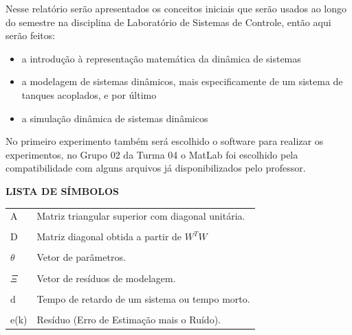 \documentclass[a4paper,12pt]{article}
\begin{document}
\vspace{3cm}

\begin{flushleft}

\hspace{4ex} Nesse relatório serão apresentados os conceitos iniciais que serão usados ao longo do semestre na disciplina de Laboratório de Sistemas de Controle, então aqui serão feitos:
\begin{itemize}
	\item a introdução à representação matemática da dinâmica de sistemas
	\item a modelagem de sistemas dinâmicos, mais especificamente de um sistema de tanques acoplados, e por último
	\item a simulação dinâmica de sistemas dinâmicos
\end{itemize}

No primeiro experimento também será escolhido o software para realizar os experimentos, no Grupo 02 da Turma 04 o MatLab foi escolhido pela compatibilidade com alguns arquivos já disponibilizados pelo professor.\\

\end{flushleft}

\vspace{1.5cm}


\newpage


\thispagestyle{empty}

\begin{center}
{\large \textbf{LISTA DE SÍMBOLOS}}
\end{center}

\vspace{3cm}

\begin{tabular}{ l l }
A\hspace{1.5cm} & Matriz triangular superior com diagonal unitária.\\
\phantom{a} & \phantom{a}\\
D\hspace{1.5cm} & Matriz diagonal obtida a partir de $W^{T}W$\\
\phantom{a} & \phantom{a}\\
$\theta$\hspace{1.5cm} & Vetor de parâmetros.\\
\phantom{a} & \phantom{a}\\
$\Xi$\hspace{1.5cm} & Vetor de resíduos de modelagem.\\
\phantom{a} & \phantom{a}\\
d\hspace{1.5cm} & Tempo de retardo de um sistema ou tempo morto.\\
\phantom{a} & \phantom{a}\\
e(k)\hspace{1.5cm} & Resíduo (Erro de Estimação mais o Ruído).\\
\end{tabular}
\end{document}
